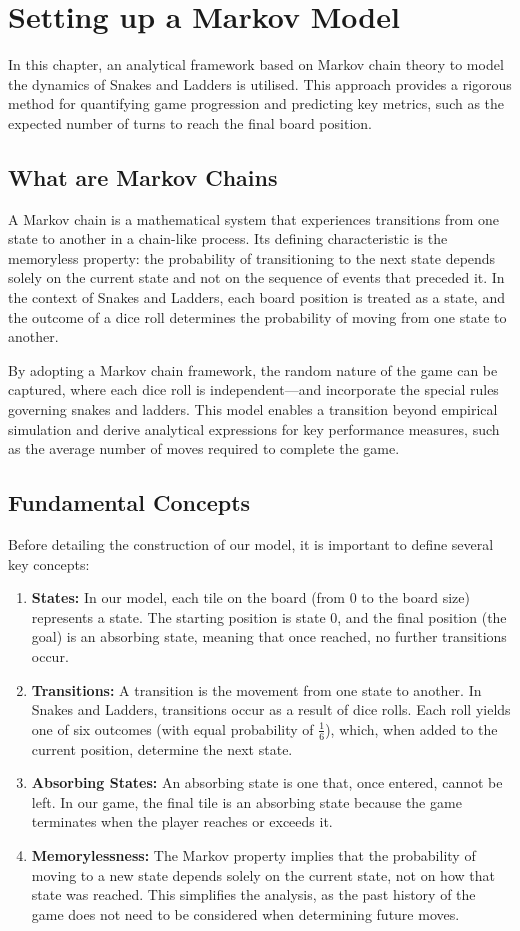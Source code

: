 \documentclass[12pt]{report}
\begin{document}
	\chapter{Setting up a Markov Model}
	In this chapter, an analytical framework based on Markov chain theory to model the dynamics of Snakes and Ladders is utilised. This approach provides a rigorous method for quantifying game progression and predicting key metrics, such as the expected number of turns to reach the final board position. 
	
	\section{What are Markov Chains}
	A Markov chain is a mathematical system that experiences transitions from one state to another in a chain-like process. Its defining characteristic is the memoryless property: the probability of transitioning to the next state depends solely on the current state and not on the sequence of events that preceded it. In the context of Snakes and Ladders, each board position is treated as a state, and the outcome of a dice roll determines the probability of moving from one state to another.
	
	By adopting a Markov chain framework, the random nature of the game can be captured, where each dice roll is independent—and incorporate the special rules governing snakes and ladders. This model enables a transition beyond empirical simulation and derive analytical expressions for key performance measures, such as the average number of moves required to complete the game.
	
	\section{Fundamental Concepts}
	Before detailing the construction of our model, it is important to define several key concepts:
	\begin{enumerate}
		\item 	\textbf{States:} In our model, each tile on the board (from 0 to the board size) represents a state. The starting position is state 0, and the final position (the goal) is an absorbing state, meaning that once reached, no further transitions occur.
		\item \textbf{Transitions:} A transition is the movement from one state to another. In Snakes and Ladders, transitions occur as a result of dice rolls. Each roll yields one of six outcomes (with equal probability of 	$\frac{1}{6}$), which, when added to the current position, determine the next state.
		\item \textbf{Absorbing States: }An absorbing state is one that, once entered, cannot be left. In our game, the final tile is an absorbing state because the game terminates when the player reaches or exceeds it.
		\item \textbf{Memorylessness: }The Markov property implies that the probability of moving to a new state depends solely on the current state, not on how that state was reached. This simplifies the analysis, as the past history of the game does not need to be considered when determining future moves.
	\end{enumerate}
	
\end{document}
